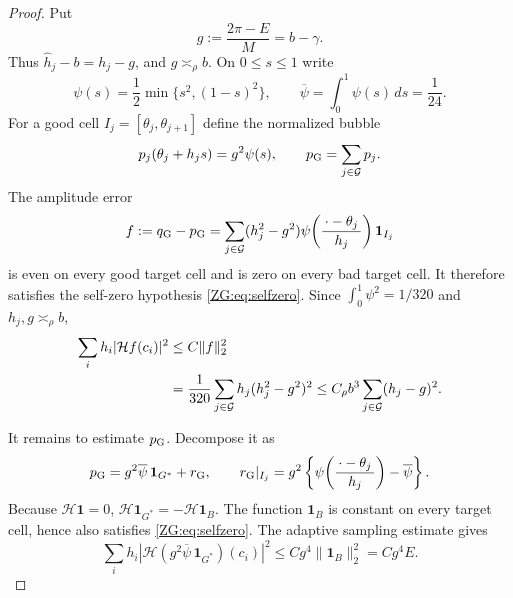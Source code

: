 \documentclass[11pt]{amsart}
\numberwithin{equation}{section}
\theoremstyle{definition}
\theoremstyle{remark}
\newcommand{\Hil}{\mathcal H}
\begin{document}
\begin{proof}
Put
\[
 g:=\frac{2\pi-E}{M}=b-\gamma.
\]
Thus $\widehat h_j-b=h_j-g$, and $g\asymp_\rho b$.  On $0\le s\le1$
write
\[
 \psi(s)=\frac12\min\{s^2,(1-s)^2\},
 \qquad \overline\psi=\int_0^1\psi(s)\,ds=\frac1{24}.
\]
For a good cell $I_j=[\theta_j,\theta_{j+1}]$ define the normalized
bubble
\[
 p_j(\theta_j+h_js)=g^2\psi(s),
 \qquad p_{\rm G}=\sum_{j\in\mathcal G}p_j.
\]
The amplitude error
\[
 f:=q_{\rm G}-p_{\rm G}
 =\sum_{j\in\mathcal G}(h_j^2-g^2)
   \psi\!\left(\frac{\,\cdot-\theta_j\,}{h_j}\right)\mathbf1_{I_j}
\]
is even on every good target cell and is zero on every bad target cell.
It therefore satisfies the self-zero hypothesis \eqref{ZG:eq:selfzero}.
Since $\int_0^1\psi^2=1/320$ and $h_j,g\asymp_\rho b$,
\begin{align}
 \sum_i h_i|\Hil f(c_i)|^2
 &\le C\|f\|_2^2\notag\\
 &=\frac1{320}\sum_{j\in\mathcal G}
 h_j(h_j^2-g^2)^2
 \le C_\rho b^3\sum_{j\in\mathcal G}(h_j-g)^2.
 \label{ZG:eq:amplitude-error}
\end{align}

It remains to estimate $p_{\rm G}$.  Decompose it as
\begin{equation}\label{ZG:eq:normalized-decomposition}
 p_{\rm G}=g^2\overline\psi\,\mathbf1_{G^*}+r_{\rm G},
 \qquad
 r_{\rm G}|_{I_j}
 =g^2\left\{\psi\!\left(\frac{\,\cdot-\theta_j\,}{h_j}\right)
             -\overline\psi\right\}.
\end{equation}
Because $\Hil\mathbf1=0$,
$\Hil\mathbf1_{G^*}=-\Hil\mathbf1_B$.  The function $\mathbf1_B$ is
constant on every target cell, hence also satisfies
\eqref{ZG:eq:selfzero}.  The adaptive sampling estimate gives
\begin{equation}\label{ZG:eq:mean-gap}
 \sum_i h_i|\Hil(g^2\overline\psi\,\mathbf1_{G^*})(c_i)|^2
 \le Cg^4\|\mathbf1_B\|_2^2
 =Cg^4E.
\end{equation}


\end{proof}
\end{document}
